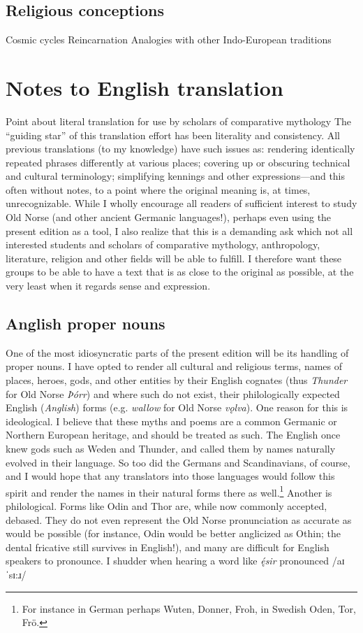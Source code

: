   \subsection{Religious conceptions}
    Cosmic cycles
    Reincarnation
    Analogies with other Indo-European traditions

\section{Notes to English translation}
  Point about literal translation for use by scholars of comparative mythology
    The “guiding star” of this translation effort has been literality and consistency. All previous translations (to my knowledge) have such issues as: rendering identically repeated phrases differently at various places; covering up or obscuring technical and cultural terminology; simplifying kennings and other expressions—and this often without notes, to a point where the original meaning is, at times, unrecognizable.
    While I wholly encourage all readers of sufficient interest to study Old Norse (and other ancient Germanic languages!), perhaps even using the present edition as a tool, I also realize that this is a demanding ask which not all interested students and scholars of comparative mythology, anthropology, literature, religion and other fields will be able to fulfill. I therefore want these groups to be able to have a text that is as close to the original as possible, at the very least when it regards sense and expression.
  \subsection{Anglish proper nouns}
    One of the most idiosyncratic parts of the present edition will be its handling of proper nouns. I have opted to render all cultural and religious terms, names of places, heroes, gods, and other entities by their English cognates (thus \emph{Thunder} for Old Norse \emph{Þórr}) and where such do not exist, their philologically expected English (\emph{Anglish}) forms (e.g. \emph{wallow} for Old Norse \emph{vǫlva}).
    One reason for this is ideological. I believe that these myths and poems are a common Germanic or Northern European heritage, and should be treated as such. The English once knew gods such as Weden and Thunder, and called them by names naturally evolved in their language. So too did the Germans and Scandinavians, of course, and I would hope that any translators into those languages would follow this spirit and render the names in their natural forms there as well.\footnote{For instance in German perhaps Wuten, Donner, Froh, in Swedish Oden, Tor, Frö.}
    Another is philological. Forms like Odin and Thor are, while now commonly accepted, debased. They do not even represent the Old Norse pronunciation as accurate as would be possible (for instance, Odin would be better anglicized as Othin; the dental fricative still survives in English!), and many are difficult for English speakers to pronounce. I shudder when hearing a word like \emph{ę́sir} pronounced /aɪˈsɪ:ɹ/

